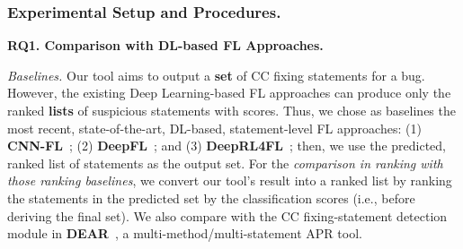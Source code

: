 \subsubsection{Experimental Setup and Procedures.\\}


{\bf RQ1. Comparison with DL-based FL Approaches.}

\vspace{1pt}
\emph{Baselines.}
Our tool aims to output a {\bf set} of CC fixing
statements for a bug. However, the existing Deep Learning-based FL
approaches can produce only the ranked {\bf lists} of suspicious
statements with scores. Thus, we chose as baselines the most
recent, state-of-the-art, DL-based, statement-level FL approaches:
(1) \textbf{CNN-FL}~\cite{zhang2019cnn}; (2) {\bf
DeepFL}~\cite{DeepFL}; and (3) {\bf DeepRL4FL}~\cite{icse21-fl}; then,
we use the predicted, ranked list of statements as the output set.
For the {\em comparison in ranking with those ranking baselines}, we convert our
tool's result into a ranked list by ranking the statements in the
predicted set by the classification scores (i.e., before deriving the
final set). We also compare with the CC fixing-statement detection module
in {\bf DEAR}~\cite{icse22}, a multi-method/multi-statement APR tool.






